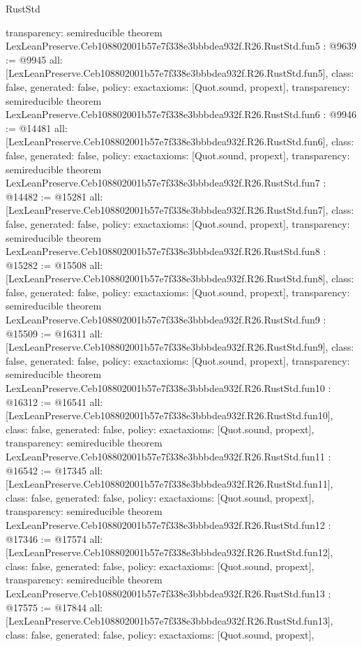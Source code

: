 \begin{lexlean}{RustStd}
\begin{coremodule}
{  transparency: semireducible
}
theorem LexLeanPreserve.Ceb108802001b57e7f338e3bbbdea932f.R26.RustStd.fun5 : @9639 := @9945 {
  all: [LexLeanPreserve.Ceb108802001b57e7f338e3bbbdea932f.R26.RustStd.fun5],
  class: false,
  generated: false,
  policy: exact{axioms: [Quot.sound, propext]},
  transparency: semireducible
}
theorem LexLeanPreserve.Ceb108802001b57e7f338e3bbbdea932f.R26.RustStd.fun6 : @9946 := @14481 {
  all: [LexLeanPreserve.Ceb108802001b57e7f338e3bbbdea932f.R26.RustStd.fun6],
  class: false,
  generated: false,
  policy: exact{axioms: [Quot.sound, propext]},
  transparency: semireducible
}
theorem LexLeanPreserve.Ceb108802001b57e7f338e3bbbdea932f.R26.RustStd.fun7 : @14482 := @15281 {
  all: [LexLeanPreserve.Ceb108802001b57e7f338e3bbbdea932f.R26.RustStd.fun7],
  class: false,
  generated: false,
  policy: exact{axioms: [Quot.sound, propext]},
  transparency: semireducible
}
theorem LexLeanPreserve.Ceb108802001b57e7f338e3bbbdea932f.R26.RustStd.fun8 : @15282 := @15508 {
  all: [LexLeanPreserve.Ceb108802001b57e7f338e3bbbdea932f.R26.RustStd.fun8],
  class: false,
  generated: false,
  policy: exact{axioms: [Quot.sound, propext]},
  transparency: semireducible
}
theorem LexLeanPreserve.Ceb108802001b57e7f338e3bbbdea932f.R26.RustStd.fun9 : @15509 := @16311 {
  all: [LexLeanPreserve.Ceb108802001b57e7f338e3bbbdea932f.R26.RustStd.fun9],
  class: false,
  generated: false,
  policy: exact{axioms: [Quot.sound, propext]},
  transparency: semireducible
}
theorem LexLeanPreserve.Ceb108802001b57e7f338e3bbbdea932f.R26.RustStd.fun10 : @16312 := @16541 {
  all: [LexLeanPreserve.Ceb108802001b57e7f338e3bbbdea932f.R26.RustStd.fun10],
  class: false,
  generated: false,
  policy: exact{axioms: [Quot.sound, propext]},
  transparency: semireducible
}
theorem LexLeanPreserve.Ceb108802001b57e7f338e3bbbdea932f.R26.RustStd.fun11 : @16542 := @17345 {
  all: [LexLeanPreserve.Ceb108802001b57e7f338e3bbbdea932f.R26.RustStd.fun11],
  class: false,
  generated: false,
  policy: exact{axioms: [Quot.sound, propext]},
  transparency: semireducible
}
theorem LexLeanPreserve.Ceb108802001b57e7f338e3bbbdea932f.R26.RustStd.fun12 : @17346 := @17574 {
  all: [LexLeanPreserve.Ceb108802001b57e7f338e3bbbdea932f.R26.RustStd.fun12],
  class: false,
  generated: false,
  policy: exact{axioms: [Quot.sound, propext]},
  transparency: semireducible
}
theorem LexLeanPreserve.Ceb108802001b57e7f338e3bbbdea932f.R26.RustStd.fun13 : @17575 := @17844 {
  all: [LexLeanPreserve.Ceb108802001b57e7f338e3bbbdea932f.R26.RustStd.fun13],
  class: false,
  generated: false,
  policy: exact{axioms: [Quot.sound, propext]},
}
\end{coremodule}
\end{lexlean}
